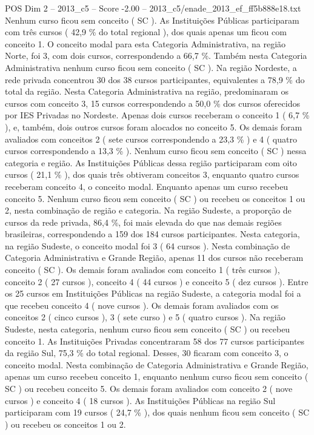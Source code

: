 \begin{textsample}{POS Dim 2 – 2013\_c5 – Score -2.00 – 2013\_c5/enade\_2013\_ef\_ff5b888e18.txt}
Nenhum curso ficou sem conceito ( SC ).
As Instituições Públicas participaram com três cursos ( 42,9 \% do total regional ), dos quais apenas um ficou com conceito 1.
O conceito modal para esta Categoria Administrativa, na região Norte, foi 3, com dois cursos, correspondendo a 66,7 \%.
Também nesta Categoria Administrativa nenhum curso ficou sem conceito ( SC ).
Na região Nordeste, a rede privada concentrou 30 dos 38 cursos participantes, equivalentes a 78,9 \% do total da região.
Nesta Categoria Administrativa na região, predominaram os cursos com conceito 3, 15 cursos correspondendo a 50,0 \% dos cursos oferecidos por IES Privadas no Nordeste.
Apenas dois cursos receberam o conceito 1 ( 6,7 \% ), e, também, dois outros cursos foram alocados no conceito 5.
Os demais foram avaliados com conceitos 2 ( sete cursos correspondendo a 23,3 \% ) e 4 ( quatro cursos correspondendo a 13,3 \% ).
Nenhum curso ficou sem conceito ( SC ) nessa categoria e região.
As Instituições Públicas dessa região participaram com oito cursos ( 21,1 \% ), dos quais três obtiveram conceitos 3, enquanto quatro cursos receberam conceito 4, o conceito modal.
Enquanto apenas um curso recebeu conceito 5.
Nenhum curso ficou sem conceito ( SC ) ou recebeu os conceitos 1 ou 2, nesta combinação de região e categoria.
Na região Sudeste, a proporção de cursos da rede privada, 86,4 \%, foi mais elevada do que nas demais regiões brasileiras, correspondendo a 159 dos 184 cursos participantes.
Nesta categoria, na região Sudeste, o conceito modal foi 3 ( 64 cursos ).
Nesta combinação de Categoria Administrativa e Grande Região, apenas 11 dos cursos não receberam conceito ( SC ).
Os demais foram avaliados com conceito 1 ( três cursos ), conceito 2 ( 27 cursos ), conceito 4 ( 44 cursos ) e conceito 5 ( dez cursos ).
Entre os 25 cursos em Instituições Públicas na região Sudeste, a categoria modal foi a que recebeu conceito 4 ( nove cursos ).
Os demais foram avaliados com os conceitos 2 ( cinco cursos ), 3 ( sete curso ) e 5 ( quatro cursos ).
Na região Sudeste, nesta categoria, nenhum curso ficou sem conceito ( SC ) ou recebeu conceito 1.
As Instituições Privadas concentraram 58 dos 77 cursos participantes da região Sul, 75,3 \% do total regional.
Desses, 30 ficaram com conceito 3, o conceito modal.
Nesta combinação de Categoria Administrativa e Grande Região, apenas um curso recebeu conceito 1, enquanto nenhum curso ficou sem conceito ( SC ) ou recebeu conceito 5.
Os demais foram avaliados com conceito 2 ( nove cursos ) e conceito 4 ( 18 cursos ).
As Instituições Públicas na região Sul participaram com 19 cursos ( 24,7 \% ), dos quais nenhum ficou sem conceito ( SC ) ou recebeu os conceitos 1 ou 2.

\end{textsample}
